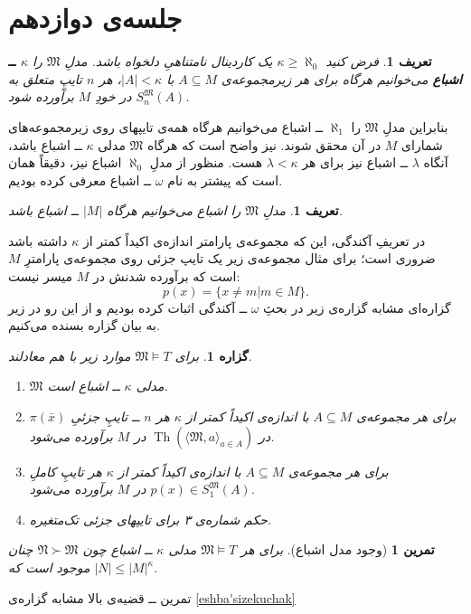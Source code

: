 \documentclass[12pt,a4paper]{report}
\theoremstyle{colorhead}
\newtheorem{tam}[thm]{تمرین}
\newtheorem{prop}[thm]{گزاره}
\newtheorem{defn}[thm]{تعریف}
\DeclareMathOperator{\Th}{Th}
\begin{document}
\section{جلسه‌ی دوازدهم}
\begin{defn}
فرض کنید
$\kappa\geq \aleph_0$
یک کاردینال نامتناهیِ دلخواه باشد. مدلِ
$\mathfrak{M}$
را 
\textbf{$\kappa$ 
ــ
اشباع }
می‌خوانیم هرگاه
برای هر زیرمجموعه‌ی
$A\subseteq M$
با
$|A|<\kappa$،
هر 
$n$ 
تایپِ
متعلق به
$S_n^\mathfrak{M}(A)$
در خودِ
$M$
برآورده شود.
\end{defn}
بنابراین مدلِ
$\mathfrak{M}$
را
$\aleph_1$ 
ــ
اشباع می‌خوانیم هرگاه همه‌ی تایپهای روی زیرمجموعه‌های شمارای 
$M$
در آن محقق شوند. نیز واضح است که هرگاه
$\mathfrak{M}$
مدلی
$\kappa$ 
ــ 
اشباع باشد، آنگاه 
$\lambda$
ــ
اشباع نیز برای هر
$\lambda<\kappa$
هست. منظور از مدلِ 
$\aleph_0$
اشباع نیز، دقیقاً همان است که پیشتر به نام
$\omega$
ــ
اشباع معرفی کرده‌ بودیم. 
\begin{defn}
مدلِ
$\mathfrak{M}$
را 
اشباع می‌خوانیم هرگاه
$|M|$
ــ‌
اشباع باشد.
\end{defn}
در تعریفِ
آکندگی، این که مجموعه‌ی پارامتر اندازه‌ی اکیداً
کمتر از
$\kappa$
داشته باشد ضروری است؛‌ برای مثال مجموعه‌ی زیر یک تایپ جزئی روی مجموعه‌ی پارامترِ
$M$
است که برآورده شدنش در 
$M$
میسر نیست:
\[
p(x)=\{x\not=m|m\in M\}.
\]
گزاره‌ای 
مشابه گزاره‌ی زیر  در بحثِ
$\omega$
ــ
آکندگی اثبات کرده بودیم و از این رو در زیر به بیان گزاره بسنده می‌کنیم.
\begin{prop}
برای
$\mathfrak{M}\models T$
موارد زیر با هم معادلند.
\begin{enumerate}
\item
$\mathfrak{M}$
مدلی 
$\kappa$ 
ــ 
اشباع است.
\item
برای هر مجموعه‌ی 
$A\subseteq M$
با اندازه‌ی اکیداً کمتر از
$\kappa$
هر
$n$ ــ
تایپِ جزئیِ
$\pi(\bar{x})$
در
$\Th(\langle\mathfrak{M},a\rangle_{a\in  A})$
در
$M$
برآورده می‌شود.
\item
برای هر مجموعه‌ی 
$A\subseteq M$
با اندازه‌ی اکیداً کمتر از
$\kappa$
هر تایپِ کاملِ
$p(x)\in S_1^\mathfrak{M}(A)$
در
$M$
برآورده می‌شود.
\item 
حکم شماره‌ی ۳ برای تایپهای جزئی تک‌متغیره.
\end{enumerate}
\end{prop}
\begin{tam}[وجود مدل اشباع]
برای هر
$\mathfrak{M}\models T$
مدلی 
$\kappa$
ــ
اشباع چون
$\mathfrak{N}\succ \mathfrak{M}$
چنان موجود است که 
$|N|\leq |M|^{\kappa}$.
\end{tam}
تمرین ــ‌ قضیه‌ی بالا مشابه گزاره‌ی
\ref{eshba'sizekuchak}
\end{document}
